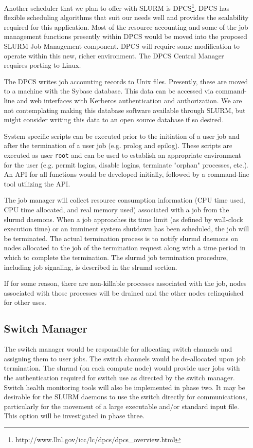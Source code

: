 Another scheduler that we plan to offer with SLURM is
DPCS\footnote{http://www.llnl.gov/icc/lc/dpcs/dpcs\_overview.html}.  DPCS
has flexible scheduling algorithms that suit our needs well and provides
the scalability required for this application. Most of the resource
accounting and some of the job management functions presently within
DPCS would be moved into the proposed SLURM Job Management component.
DPCS will require some modification to operate within this new, richer
environment. The DPCS Central Manager requires porting to Linux.

The DPCS writes job accounting records to Unix files. Presently, these are
moved to a machine with the Sybase database. This data can be accessed
via command-line and web interfaces with Kerberos authentication and
authorization.  We are not contemplating making this database software
available through SLURM, but might consider writing this data to an open
source database if so desired.

System specific scripts can be executed prior to the initiation of a user
job and after the termination of a user job (e.g. prolog and epilog).
These scripts are executed as user {\tt root} and can be used to establish
an appropriate environment for the user (e.g. permit logins, disable
logins, terminate "orphan" processes, etc.).  An API for all functions
would be developed initially, followed by a command-line tool utilizing
the API.

The job manager will collect resource consumption information (CPU
time used, CPU time allocated, and real memory used) associated with
a job from the slurmd daemons.  When a job approaches its time limit
(as defined by wall-clock execution time) or an imminent system shutdown
has been scheduled, the job will be terminated.  The actual termination
process is to notify slurmd daemons on nodes allocated to the job of
the termination request along with a time period in which to complete
the termination.  The slurmd job termination procedure, including job
signaling, is described in the slrumd section.

If for some reason, there are non-killable processes associated with 
the job, nodes associated with those processes will be drained and 
the other nodes relinquished for other uses.

\subsection{Switch Manager}

The switch manager would be responsible for allocating switch channels and
assigning them to user jobs. The switch channels would be de-allocated
upon job termination.  The slurmd (on each compute node) would provide
user jobs with the authentication required for switch use as directed
by the switch manager. Switch health monitoring tools will also be
implemented in phase two. It may be desirable for the SLURM daemons
to use the switch directly for communications, particularly for the
movement of a large executable and/or standard input file. This option
will be investigated in phase three.

